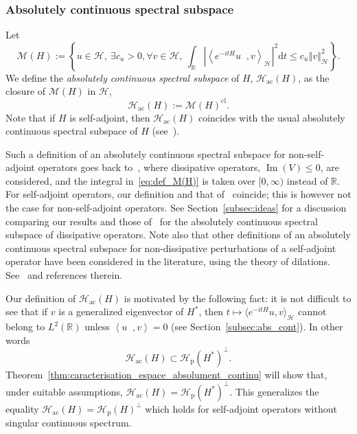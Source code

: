 \documentclass[10pt]{amsart}
\theoremstyle{definition}\newtheorem{defi}[theo]{Definition}\newtheorem{rema}[theo]{Remark}\newtheorem{exam}[theo]{Example}\newtheorem{exem}[theo]{Example}\newtheorem{nota}[theo]{Notation}
\newcommand{\Hi}{\mathcal{H}}
\newcommand{\R}{\mathbb{R}}
\newcommand{\rmp}{\mathrm{p}}
\newcommand{\acr}{\mathrm{ac}}
\newcommand{\rmd}{\mathrm{d}}
\newcommand{\norme}[1]{\left\Vert #1\right\Vert}
\newcommand{\scal}[2]{\left\langle{#1} \middle., {#2}\right\rangle}
\newcommand{\abso}[1]{\left|{#1}\right|}
\DeclareMathOperator{\im}{Im}
\let\oldexists\exists
\renewcommand*{\exists}{\mathrel{\oldexists}}
\let\oldforall\forall
\renewcommand*{\forall}{\mathrel{\oldforall}}
\begin{document}
\subsubsection{Absolutely continuous spectral subspace}\label{subsub:defi_absolutely_continuous_spectral_subspace}

Let
\begin{equation}\label{eq:def_M(H)}
\mathcal{M}(H):=\left\lbrace u\in\Hi,~\exists c_u>0,\forall v\in\Hi,~\int_\R\abso{\scal{e^{-itH}u}{v}_\Hi}^2\rmd t\leq c_u\norme{v}^2_\Hi \right\rbrace.
\end{equation}
We define the \emph{absolutely continuous spectral subspace} of $H$, $\Hi_\acr(H)$, as the closure of $\mathcal{M}(H)$ in $\Hi$,
\begin{equation}\label{eq:def_Hac}
\Hi_\acr(H) := \mathcal{M}(H)^{\mathrm{cl}}.
\end{equation}
Note that if $H$ is self-adjoint, then $\Hi_{\acr}(H)$ coincides with the usual absolutely continuous spectral subspace of $H$ (see~\cite[Theorem~6.24]{Da80}).

Such a definition of an absolutely continuous spectral subspace for non-self-adjoint operators goes back to~\cite{Da78_01}, where dissipative operators, $\im(V)\le0$, are considered, and the integral in~\eqref{eq:def_M(H)} is taken over $[0,\infty)$ instead of $\R$. For self-adjoint operators, our definition and that of~\cite{Da78_01} coincide; this is however not the case for non-self-adjoint operators. See Section~\ref{subsec:ideas} for a discussion comparing our results and those of~\cite{Da78_01,Da80_01} for the absolutely continuous spectral subspace of dissipative operators. Note also that other definitions of an absolutely continuous spectral subspace for non-dissipative perturbations of a self-adjoint operator have been considered in the literature, using the theory of dilations. See~\cite{KiNa09_01,Na76_01} and references therein.

Our definition of $\Hi_\acr(H)$ is motivated by the following fact: it is not difficult to see that if $v$ is a generalized eigenvector of $H^*$, then $t\mapsto \langle e^{-itH}u, v \rangle_\Hi$ cannot belong to $L^2(\R)$ unless $\scal{u}{v}=0$ (see Section~\ref{subsec:abs_cont}). In other words
\begin{equation*}
\Hi_{\acr}(H)\subset\Hi_{\rmp}(H^*)^\perp.
\end{equation*}
Theorem~\ref{thm:caracterisation_espace_absolument_continu} will show that, under suitable assumptions, $
\Hi_\acr(H) = \Hi_{\rmp}(H^*)^\perp$.  This generalizes the equality $
\Hi_\acr(H) = \Hi_{\rmp}(H)^\perp$ which holds for self-adjoint operators without singular continuous spectrum.
\end{document}

